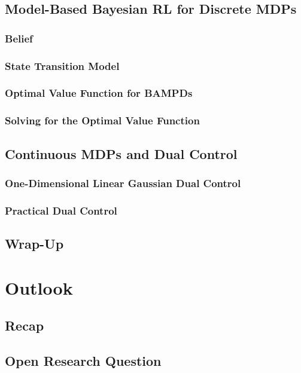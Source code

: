 	\section{Model-Based Bayesian RL for Discrete MDPs} %

		\subsection{Belief} %

		\subsection{State Transition Model} %

		\subsection{Optimal Value Function for BAMPDs} %

		\subsection{Solving for the Optimal Value Function} %

	\section{Continuous MDPs and Dual Control} %

		\subsection{One-Dimensional Linear Gaussian Dual Control} %

		\subsection{Practical Dual Control} %

	\section{Wrap-Up} %

\chapter{Outlook} %

	\section{Recap} %

	\section{Open Research Question} %
